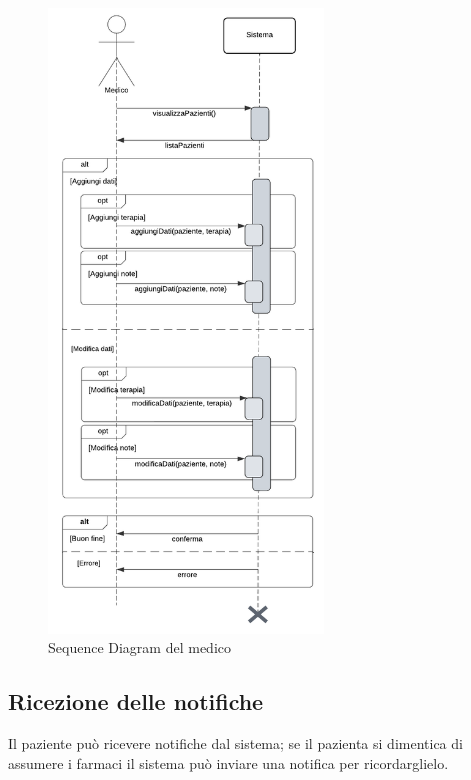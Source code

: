 \documentclass[a4paper]{article}
\begin{document}
\begin{figure}[H]
	\centering
	\includegraphics[width=0.65\textwidth]{sdMedico}
	\caption{Sequence Diagram del medico}
	\label{fig:sdMedico}
\end{figure}

\subsection{Ricezione delle notifiche}

Il paziente può ricevere notifiche dal sistema; se il pazienta si dimentica di assumere i farmaci
il sistema può inviare una notifica per ricordarglielo. 
\end{document}
